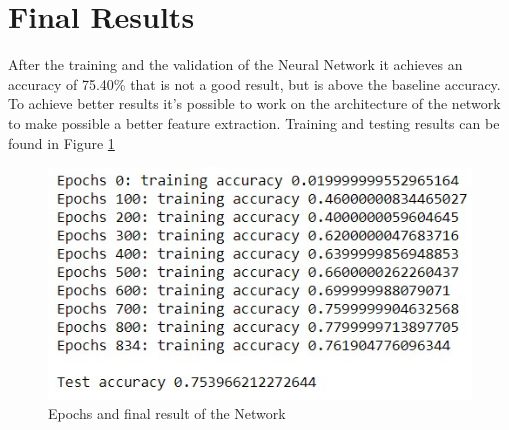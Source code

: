 \documentclass{article}
\begin{document}
\section{Final Results}
After the training and the validation of the Neural Network it achieves an accuracy of 75.40\% that is not a good result, but is above the baseline accuracy. To achieve better results it's possible to work on the architecture of the network to make possible a better feature extraction.
Training and testing results can be found in Figure \ref{fig:results}

\begin{figure}[ht]
  \centering
  \includegraphics[scale=0.6]{images/results.jpg}
  \caption{Epochs and final result of the Network}
  \label{fig:results}
\end{figure}
\end{document}
